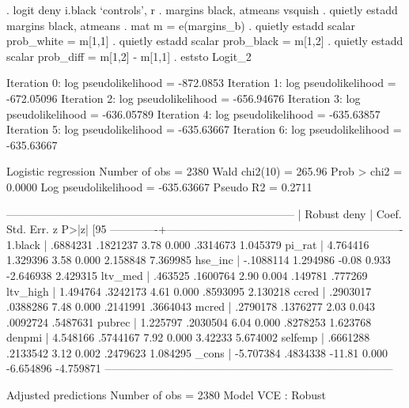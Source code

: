 \documentclass{scrartcl}
\begin{document}
\begin{SinputC}
. logit deny i.black `controls', r
. margins black, atmeans vsquish
. quietly estadd margins black, atmeans
. mat m = e(margins_b)
. quietly estadd scalar prob_white = m[1,1]
. quietly estadd scalar prob_black = m[1,2]
. quietly estadd scalar prob_diff = m[1,2] - m[1,1]
. eststo Logit_2
\end{SinputC}
\begin{SoutputC}
Iteration 0:   log pseudolikelihood =  -872.0853
Iteration 1:   log pseudolikelihood = -672.05096
Iteration 2:   log pseudolikelihood = -656.94676
Iteration 3:   log pseudolikelihood = -636.05789
Iteration 4:   log pseudolikelihood = -635.63857
Iteration 5:   log pseudolikelihood = -635.63667
Iteration 6:   log pseudolikelihood = -635.63667

Logistic regression                               Number of obs   =       2380
                                                  Wald chi2(10)   =     265.96
                                                  Prob > chi2     =     0.0000
Log pseudolikelihood = -635.63667                 Pseudo R2       =     0.2711

------------------------------------------------------------------------------
             |               Robust
        deny |      Coef.   Std. Err.      z    P>|z|     [95%
-------------+----------------------------------------------------------------
     1.black |   .6884231   .1821237     3.78   0.000     .3314673    1.045379
      pi_rat |   4.764416   1.329396     3.58   0.000     2.158848    7.369985
     hse_inc |  -.1088114   1.294986    -0.08   0.933    -2.646938    2.429315
     ltv_med |    .463525   .1600764     2.90   0.004      .149781     .777269
    ltv_high |   1.494764   .3242173     4.61   0.000     .8593095    2.130218
       ccred |   .2903017   .0388286     7.48   0.000     .2141991    .3664043
       mcred |   .2790178   .1376277     2.03   0.043     .0092724    .5487631
      pubrec |   1.225797   .2030504     6.04   0.000     .8278253    1.623768
      denpmi |   4.548166   .5744167     7.92   0.000      3.42233    5.674002
     selfemp |   .6661288   .2133542     3.12   0.002     .2479623    1.084295
       _cons |  -5.707384   .4834338   -11.81   0.000    -6.654896   -4.759871
------------------------------------------------------------------------------

Adjusted predictions                              Number of obs   =       2380
Model VCE    : Robust


\end{SoutputC}
\end{document}
